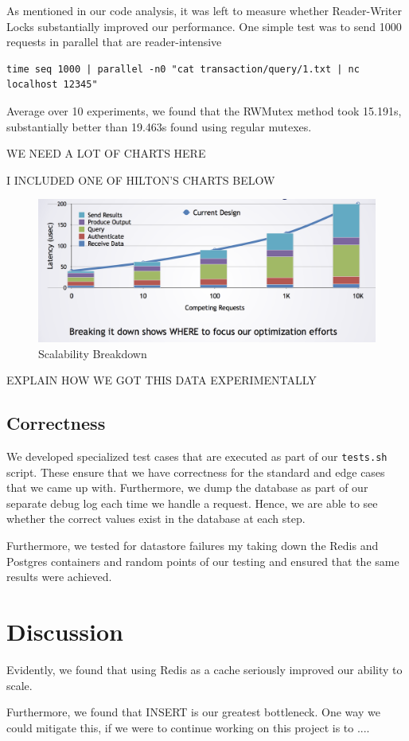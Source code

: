 \documentclass[titlepage, 11pt]{article}
\newcommand\0{\mathbf{0}}
\newcommand\<{\langle}
\renewcommand\>{\rangle}
\begin{document}
As mentioned in our code analysis, it was left to measure whether Reader-Writer Locks substantially improved our performance. One simple test was to send 1000 requests in parallel that are reader-intensive 

\begin{lstlisting}
time seq 1000 | parallel -n0 "cat transaction/query/1.txt | nc localhost 12345"
\end{lstlisting}

Average over 10 experiments, we found that the RWMutex method took 15.191s, substantially better than 19.463s found using regular mutexes.

WE NEED A LOT OF CHARTS HERE

I INCLUDED ONE OF HILTON'S CHARTS BELOW

\begin{figure}[H]
\centering
\includegraphics[width=\linewidth]{sample_hilton.png}	
\caption{Scalability Breakdown}
\end{figure}

EXPLAIN HOW WE GOT THIS DATA EXPERIMENTALLY

\subsection{Correctness}

We developed specialized test cases that are executed as part of our \texttt{tests.sh} script. These ensure that we have correctness for the standard and edge cases that we came up with. Furthermore, we dump the database as part of our separate debug log each time we handle a request. Hence, we are able to see whether the correct values exist in the database at each step. 

Furthermore, we tested for datastore failures my taking down the Redis and Postgres containers and random points of our testing and ensured that the same results were achieved. 

\section{Discussion}

Evidently, we found that using Redis as a cache seriously improved our ability to scale. 

Furthermore, we found that INSERT is our greatest bottleneck. One way we could mitigate this, if we were to continue working on this project is to .... 
\end{document}
